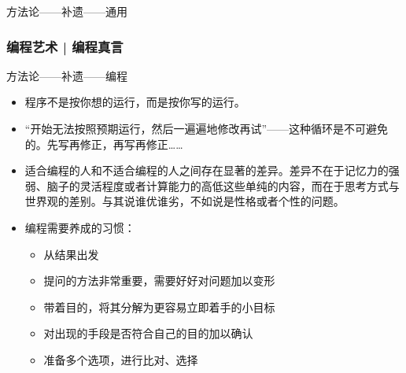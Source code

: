 \begin{frame}
\begin{block}{方法论——补遗——通用}
\begin{itemize}
    \end{itemize}
  \end{block}
\end{frame}

\begin{frame}
  \frametitle{编程艺术 | 编程真言}
  \begin{block}{方法论——补遗——编程}
    \begin{itemize}
      \item 程序不是按你想的运行，而是按你写的运行。
      \item “开始无法按照预期运行，然后一遍遍地修改再试”——这种循环是不可避免的。先写再修正，再写再修正……
      \item 适合编程的人和不适合编程的人之间存在显著的差异。差异不在于记忆力的强弱、脑子的灵活程度或者计算能力的高低这些单纯的内容，而在于思考方式与世界观的差别。与其说谁优谁劣，不如说是\alert{性格或者个性}的问题。
      \item 编程需要养成的\alert{习惯}：
        \begin{itemize}
          \item 从结果出发
          \item 提问的方法非常重要，需要好好对问题加以变形
          \item 带着目的，将其分解为更容易立即着手的小目标
          \item 对出现的手段是否符合自己的目的加以确认
          \item 准备多个选项，进行比对、选择
        \end{itemize}
    \end{itemize}
  \end{block}
\end{frame}

